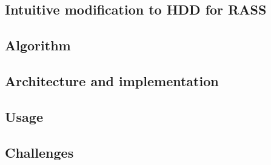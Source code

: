 \subsection{Intuitive modification to HDD for RASS}
\label{sec:intutive}


\subsection{Algorithm}

\label{sec:algorithm}


\subsection{Architecture and implementation}
\label{sec:architecture}



\subsection{Usage}





\subsection{Challenges}





